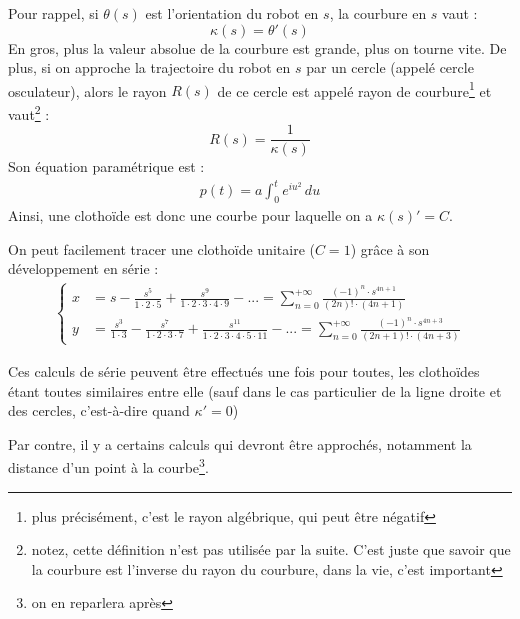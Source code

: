 \documentclass[11pt]{article}
\begin{document}
    Pour rappel, si $\theta(s)$ est l'orientation du robot en $s$, la courbure en $s$ vaut :
    \[\kappa(s) = \theta'(s)\]
    En gros, plus la valeur absolue de la courbure est grande, plus on tourne vite. De plus, si on approche la trajectoire du robot en $s$ par un cercle (appelé cercle osculateur), alors le rayon $R(s)$ de ce cercle est appelé rayon de courbure\footnote{plus précisément, c'est le rayon algébrique, qui peut être négatif} et vaut\footnote{notez, cette définition n'est pas utilisée par la suite. C'est juste que savoir que la courbure est l'inverse du rayon du courbure, dans la vie, c'est important} :
    \[R(s) = \frac{1}{\kappa(s)}\]
    Son équation paramétrique est :
    \begin{align*}
        \tag{*}
        p(t) = a \int_0^t e^{i u^2} \, du
        \label{equ:clotho_param}
    \end{align*}
    Ainsi, une clothoïde est donc une courbe pour laquelle on a $\kappa(s)' = C$.

    On peut facilement tracer une clothoïde unitaire ($C = 1$) grâce à son développement en série :
    \begin{align*}
        \tag{**}
        \begin{cases}
            x &= s - \frac{s^5}{1 \cdot 2 \cdot 5} + \frac{s^9}{1 \cdot 2 \cdot 3 \cdot 4 \cdot 9} - ... = \sum_{n=0}^{+\infty} \frac{(-1)^n \cdot s^{4n+1}}{(2n)! \cdot (4n+1)} \\
            y &= \frac{s^3}{1 \cdot 3} - \frac{s^7}{1 \cdot 2 \cdot 3 \cdot 7} + \frac{s^{11}}{1 \cdot 2 \cdot 3 \cdot 4 \cdot 5 \cdot 11} - ... = \sum_{n=0}^{+\infty} \frac{(-1)^n \cdot s^{4n+3}}{(2n+1)! \cdot (4n+3)}
        \end{cases}
        \label{equ:clotho}
    \end{align*}

    Ces calculs de série peuvent être effectués une fois pour toutes, les clothoïdes étant toutes similaires entre elle (sauf dans le cas particulier de la ligne droite et des cercles, c'est-à-dire quand $\kappa' = 0$)

    Par contre, il y a certains calculs qui devront être approchés, notamment la distance d'un point à la courbe\footnote{on en reparlera après}.

\end{document}
